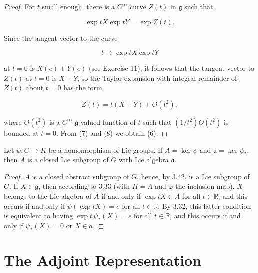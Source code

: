\begin{proof}
For $t$ small enough, there is a $C^{\infty}$ curve $Z(t)$ in $\mathfrak{g}$ such that

\begin{equation}
\tag{7}\label{eq:3.42:7}
\exp tX\exp tY=\exp Z(t).
\end{equation}

Since the tangent vector to the curve

\[
t\mapsto\exp t X\exp t Y
\]

at $t=0$ is $X(e)+Y(e)$ (see Exercise 11), it follows that the tangent vector to $Z(t)$ at $t=0$ is $X+Y$, so the Taylor expansion with integral remainder of $Z(t)$ about $t=0$ has the form

\begin{equation}
\tag{8}\label{eq:3.42:8}
Z(t)=t(X+Y)+O(t^{2}),
\end{equation}

where $O(t^{2})$ is a $C^{\infty}$ $\mathfrak{g}$-valued function of $t$ such that $(1/t^{2})O(t^{2})$ is bounded at $t=0$. From (7) and (8) we obtain (6).

\end{proof}

\begin{theorem}\label{thm:3.43}
Let $\psi: G \to K$ be a homomorphism of Lie groups. If $A = \ker \psi$ and $\mathfrak{a} = \ker \psi_{*}$, then $A$ is a closed Lie subgroup of $G$ with Lie algebra $\mathfrak{a}$.

\end{theorem}

\begin{proof}
$A$ is a closed abstract subgroup of $G$, hence, by 3.42, is a Lie subgroup of $G$. If $X\in\mathfrak{g}$, then according to 3.33 (with $H = A$ and $\varphi$ the inclusion map), $X$ belongs to the Lie algebra of $A$ if and only if $\exp t X \in A$ for all $t \in \mathbb{R}$, and this occurs if and only if $\psi(\exp t X) = e$ for all $t \in \mathbb{R}$. By 3.32, this latter condition is equivalent to having $\exp t \, \psi_{*}(X) = e$ for all $t \in \mathbb{R}$, and this occurs if and only if $\psi_{*}(X) = 0$ or $X \in a$.

\end{proof}

\section{The Adjoint Representation}

